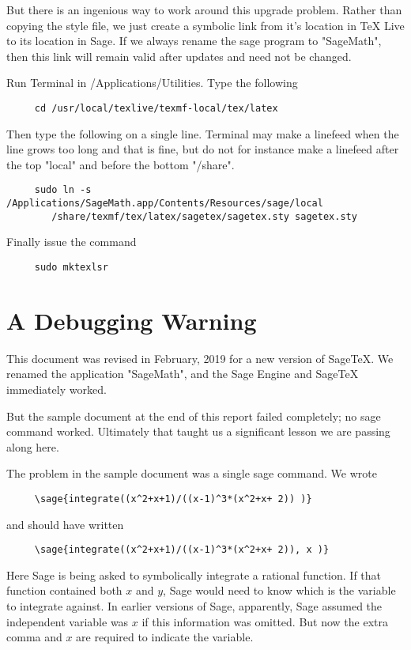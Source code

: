 \documentclass[11pt, oneside]{amsart}
\begin{document}
But there is an ingenious way to work around this upgrade problem. Rather than copying the style file, we just
create a symbolic link from it's location in TeX Live to its location in Sage. If we always rename the sage program to "SageMath", then this link will remain valid after updates and need not be changed.

Run Terminal in /Applications/Utilities. Type the following
\begin{verbatim}
     cd /usr/local/texlive/texmf-local/tex/latex
\end{verbatim}
Then type the following on a single line. Terminal may make a linefeed when
the line  grows too long and that is fine, but do not for instance make a linefeed
after the top "local" and before the bottom "/share".
\begin{verbatim}
     sudo ln -s /Applications/SageMath.app/Contents/Resources/sage/local
        /share/texmf/tex/latex/sagetex/sagetex.sty sagetex.sty
\end{verbatim}

Finally issue the command
\begin{verbatim}		
     sudo mktexlsr
\end{verbatim}
	
\section{A Debugging Warning}

This document was revised in February, 2019 for a new version of SageTeX. We renamed the  application  "SageMath", and the Sage Engine and SageTeX immediately worked. 

But the sample  document at the end of this report failed completely; no sage command worked. Ultimately that taught us a significant lesson we are passing along here.

The problem in the sample document was a single sage command. We wrote 
\begin{verbatim}
     \sage{integrate((x^2+x+1)/((x-1)^3*(x^2+x+ 2)) )}
\end{verbatim}
and should have written
\begin{verbatim}
     \sage{integrate((x^2+x+1)/((x-1)^3*(x^2+x+ 2)), x )}
\end{verbatim}
Here Sage is being asked to symbolically integrate a rational function. If that function contained both $x$ and $y$, Sage would need to know which is the variable to integrate against. In earlier versions of Sage, apparently, Sage assumed the independent variable was $x$ if this information was omitted.  But now the extra comma and $x$ are required to indicate the variable.
\end{document}
